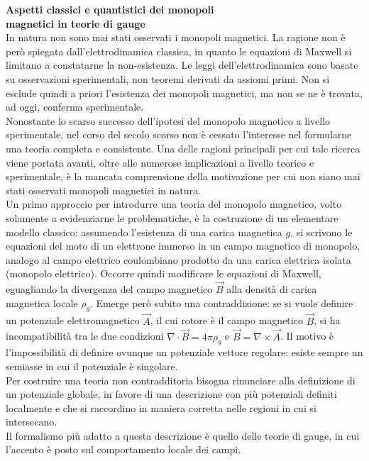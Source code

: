 
{\huge \textbf{Aspetti classici e quantistici dei monopoli \\magnetici in teorie di gauge}}\\

In natura non sono mai stati osservati i monopoli magnetici. La ragione non è però
spiegata dall'elettrodinamica classica, in quanto le equazioni di Maxwell
si limitano a constatarne la non-esistenza. Le leggi dell'elettrodinamica
sono basate su osservazioni sperimentali, non teoremi derivati da assiomi primi.
Non si esclude quindi a priori l'esistenza dei monopoli magnetici, ma non se ne
è trovata, ad oggi, conferma sperimentale. \\
Nonostante lo scarso successo dell'ipotesi del monopolo magnetico a livello sperimentale,
nel corso del secolo scorso non è cessato l'interesse nel formularne una teoria
completa e consistente. Una delle ragioni principali per cui tale ricerca viene
portata avanti, oltre alle numerose implicazioni a livello
teorico e sperimentale, è la mancata comprensione della motivazione
per cui non siano mai stati osservati monopoli magnetici in natura.\\

Un primo approccio per introdurre una teoria del monopolo magnetico, volto solamente
a evidenziarne le problematiche, è la costruzione di un elementare modello classico:
assumendo l'esistenza di una carica magnetica $g$, si scrivono le equazioni del moto
di un elettrone immerso in un campo magnetico di monopolo, analogo al campo elettrico
coulombiano prodotto da una carica elettrica isolata
(monopolo elettrico). Occorre quindi modificare le equazioni di Maxwell,
eguagliando la divergenza del campo magnetico $\vec B$ alla densità di carica magnetica
locale $\rho_g$.
Emerge però subito una contraddizione: se si vuole definire
un potenziale elettromagnetico $\vec A$, il cui rotore è il campo magnetico $\vec B$,
si ha incompatibilità tra le due condizioni $\nabla \cdot \vec B = 4 \pi\rho_g$ e
$\vec B = \nabla \times \vec A$. Il motivo è l'impossibilità di definire ovunque un
potenziale vettore regolare: esiste sempre un semiasse in cui il potenziale è singolare.\\

Per costruire una teoria non contradditoria bisogna rinunciare alla definizione
di un potenziale globale, in favore di una descrizione con più potenziali definiti
localmente e che si raccordino in maniera corretta nelle regioni in cui si intersecano.\\
Il formalismo più adatto a questa descrizione è quello delle teorie di gauge, in
cui l'accento è posto sul comportamento locale dei campi.\\

